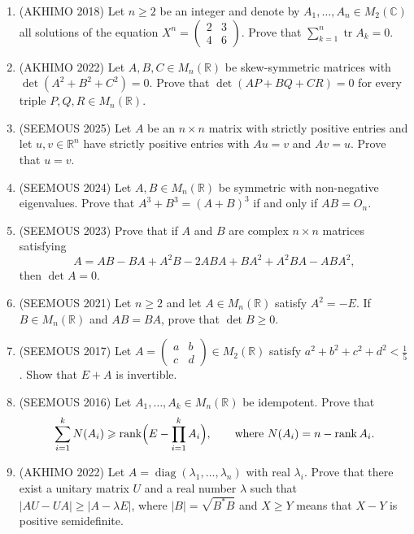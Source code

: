 \documentclass[11pt,a4paper]{article}
\DeclareMathOperator{\tr}{tr}
\DeclareMathOperator{\rank}{rank}
\begin{document}
\begin{enumerate}
\item (AKHIMO 2018) Let $n\geqslant2$ be an integer and denote by $A_1,\dots,A_n\in M_2(\mathbb C)$
all solutions of the equation $X^n=\begin{pmatrix}2&3\\4&6\end{pmatrix}$. Prove that
$\sum_{k=1}^n\tr A_k=0$.

\item (AKHIMO 2022) Let $A,B,C\in M_n(\mathbb R)$ be skew-symmetric matrices with
$\det(A^2+B^2+C^2)=0$. Prove that $\det(AP+BQ+CR)=0$ for every triple
$P,Q,R\in M_n(\mathbb R)$.

\item (SEEMOUS 2025) Let $A$ be an $n\times n$ matrix with strictly positive entries and let
$u,v\in\mathbb R^n$ have strictly positive entries with $Au=v$ and $Av=u$. Prove that $u=v$.

\item (SEEMOUS 2024) Let $A,B\in M_n(\mathbb R)$ be symmetric with non-negative eigenvalues. Prove
that $A^3+B^3=(A+B)^3$ if and only if $AB=O_n$.

\item (SEEMOUS 2023) Prove that if $A$ and $B$ are complex $n\times n$ matrices satisfying
\[
A=AB-BA+A^2B-2ABA+BA^2+A^2BA-ABA^2,
\]
then $\det A=0$.

\item (SEEMOUS 2021) Let $n\geqslant2$ and let $A\in M_n(\mathbb R)$ satisfy $A^2=-E$. If
$B\in M_n(\mathbb R)$ and $AB=BA$, prove that $\det B\geqslant0$.

\item (SEEMOUS 2017) Let $A=\begin{pmatrix}a&b\\c&d\end{pmatrix}\in M_2(\mathbb R)$ satisfy
$a^2+b^2+c^2+d^2<\frac15$. Show that $E+A$ is invertible.

\item (SEEMOUS 2016) Let $A_1,\dots,A_k\in M_n(\mathbb R)$ be idempotent. Prove that
\[
\sum_{i=1}^kN(A_i)\geqslant\rank\Bigl(E-\prod_{i=1}^kA_i\Bigr),\qquad\text{where }
N(A_i)=n-\rank A_i.
\]

\item (AKHIMO 2022) Let $A=\operatorname{diag}(\lambda_1,\dots,\lambda_n)$ with real $\lambda_i$.
Prove that there exist a unitary matrix $U$ and a real number $\lambda$ such that
$|AU-UA|\geqslant|A-\lambda E|$, where $|B|=\sqrt{B^*B}$ and $X\geqslant Y$ means that $X-Y$ is
positive semidefinite.


\end{enumerate}
\end{document}

